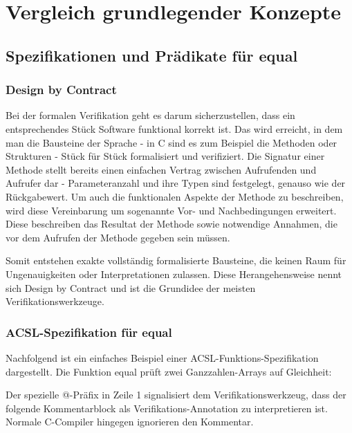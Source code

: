 ﻿
\chapter{Vergleich grundlegender Konzepte}

\section{Spezifikationen und Prädikate für equal}
\label{sec:design-by-contract}
\subsection{Design by Contract}

Bei der formalen Verifikation geht es darum sicherzustellen, dass ein entsprechendes Stück Software
funktional korrekt ist. Das wird erreicht, in dem man die Bausteine der Sprache - in C sind es zum Beispiel die Methoden 
oder Strukturen -
Stück für Stück formalisiert und verifiziert. Die Signatur einer Methode stellt bereits einen einfachen Vertrag zwischen
Aufrufenden und Aufrufer dar - Parameteranzahl und ihre Typen sind festgelegt, genauso wie der Rückgabewert.
Um auch die funktionalen Aspekte der Methode zu beschreiben, wird diese Vereinbarung um sogenannte Vor- und Nachbedingungen erweitert.
Diese beschreiben das Resultat der Methode sowie notwendige Annahmen, die vor dem Aufrufen der Methode gegeben sein müssen. 

Somit entstehen exakte vollständig formalisierte Bausteine, die keinen Raum für Ungenauigkeiten oder Interpretationen zulassen.
Diese Herangehensweise nennt sich Design by Contract und ist die Grundidee der meisten Verifikationswerkzeuge.



\subsection{ACSL-Spezifikation für equal}
\label{sec:design-by-contract:acsl-spezifikation}

Nachfolgend ist ein einfaches Beispiel einer ACSL-Funktions-Spezifikation dargestellt.
Die Funktion equal prüft zwei Ganzzahlen-Arrays auf Gleichheit:



Der spezielle @-Präfix in Zeile 1 signalisiert dem Verifikationswerkzeug, 
dass der folgende Kommentarblock als Verifikations-Annotation zu interpretieren ist. Normale C-Compiler hingegen
ignorieren den Kommentar.

